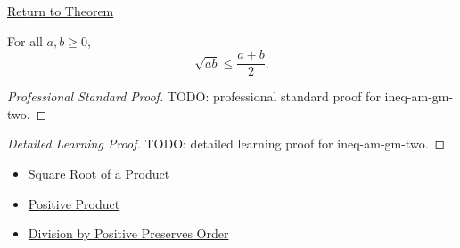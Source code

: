 \newpage
{}
\label{prf:ineq-am-gm-two}

\begin{remark*}[Return]
\hyperref[thm:ineq-am-gm-two]{Return to Theorem}
\end{remark*}

\begin{theorem*}
For all $a, b \ge 0$,
\[
  \sqrt{ab} \le \frac{a + b}{2}.
\]
\end{theorem*}

\begin{proof}[Professional Standard Proof]
\LRAProofBodyStart
TODO: professional standard proof for ineq-am-gm-two.
\end{proof}

\begin{proof}[Detailed Learning Proof]
\LRAProofBodyStart
TODO: detailed learning proof for ineq-am-gm-two.
\end{proof}

\begin{remark*}
\end{remark*}

\begin{dependencies}
\begin{itemize}
  \item \hyperref[thm:sqrt-product]{Square Root of a Product}
  \item \hyperref[lem:positive-product]{Positive Product}
  \item \hyperref[lem:division-by-positive-preserves-order]{Division by Positive Preserves Order}
\end{itemize}
\end{dependencies}

\clearpage
